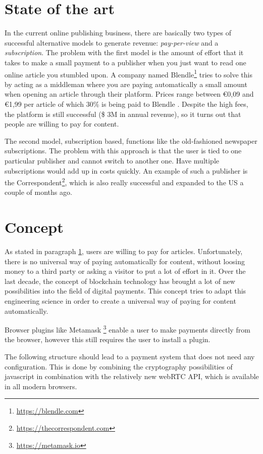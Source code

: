 \documentclass[a4paper]{article}
\begin{document}
\section{State of the art}
\label{stateoftheart}
In the current online publishing business, there are basically two types of successful alternative models to generate revenue: \textit{pay-per-view }and a \textit{subscription}. The problem with the first model is the amount of effort that it takes to make a small payment to a publisher when you just want to read one online article you stumbled upon. A company named Blendle\footnote{\url{https://blendle.com}} tries to solve this by acting as a middleman where you are paying automatically a small amount when opening an article through their platform. Prices range between €0,09 and €1,99 per article of which 30\% is being paid to Blendle . Despite the high fees, the platform is still successful (\$ 3M in annual revenue), so it turns out that people are willing to pay for content.

The second model, subscription based, functions like the old-fashioned newspaper subscriptions. The problem with this approach is that the user is tied to one particular publisher and cannot switch to another one. Have multiple subscriptions would add up in costs quickly. An example of such a publisher is the Correspondent\footnote{\url{https://thecorrespondent.com}}, which is also really successful and expanded to the US a couple of months ago.

\section {Concept}
As stated in paragraph \ref{stateoftheart}, users are willing to pay for articles. Unfortunately, there is no universal way of paying automatically for content, without loosing money to a third party or asking a visitor to put a lot of effort in it. Over the last decade, the concept of blockchain technology has brought a lot of new possibilities into the field of digital payments. This concept tries to adapt this engineering science in order to create a universal way of paying for content automatically.

Browser plugins like Metamask \footnote{\url{https://metamask.io}} enable a user to make payments directly from the browser, however this still requires the user to install a plugin.

The following structure should lead to a payment system that does not need any configuration. This is done by combining the cryptography possibilities of javascript in combination with the relatively new webRTC API, which is available in all modern browsers.
\end{document}
